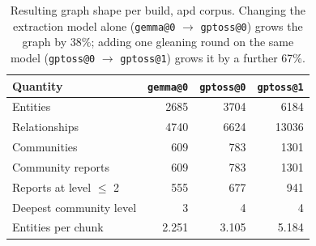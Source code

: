 \begin{table}[htbp]
  \centering
  \caption{Resulting graph shape per build, apd corpus. Changing the extraction model alone
    (\texttt{gemma@0} $\rightarrow$ \texttt{gptoss@0}) grows the graph by 38\%; adding one gleaning
    round on the same model (\texttt{gptoss@0} $\rightarrow$ \texttt{gptoss@1}) grows it by a
    further 67\%.}
  \label{tab:graph-shape}
  \begin{tabular}{lrrr}
    \toprule
    Quantity & \texttt{gemma@0} & \texttt{gptoss@0} & \texttt{gptoss@1} \\
    \midrule
    Entities                  & 2685 & 3704 & 6184 \\
    Relationships             & 4740 & 6624 & 13036 \\
    Communities               &  609 &  783 & 1301 \\
    Community reports         &  609 &  783 & 1301 \\
    Reports at level $\le$ 2  &  555 &  677 &  941 \\
    Deepest community level   &    3 &    4 &    4 \\
    \midrule
    Entities per chunk        & 2.251 & 3.105 & 5.184 \\
    \bottomrule
  \end{tabular}
\end{table}
